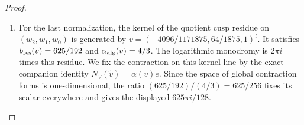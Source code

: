\documentclass[11pt,a4paper]{article}
\numberwithin{equation}{section}
\theoremstyle{definition}
\begin{document}
\begin{proof}
\begin{enumerate}[label=\arabic*.]
The extension is nontrivial, since its dual has no common
invariant vector by \cref{night:P1.1}; consequently its coordinate $s$ is nonzero.
Set $t=3125d/60$.  Its full row is
$\beta=s b+t r_0\Gamma_W$.  The constant bundle maps
\[
 C=\begin{pmatrix}1&-t r_0\\0&sI_5\end{pmatrix},\qquad
 C^{-1}=\begin{pmatrix}1&(t/s)r_0\\0&s^{-1}I_5\end{pmatrix}
\]
are holomorphic in the stated root frames and fix the invariant
section $e$.  Direct multiplication gives
\[
 C^{-1}\Gamma_6 C+C^{-1}dC
   =\begin{pmatrix}0&\beta\\0&\Gamma_W\end{pmatrix}.
\]
This proves the required equivalence of the complete flat bundles
with their fixed invariant line.  Evaluation at the marked basepoint
gives a common intertwiner for both specified meridians.  Thus its
existence follows from the exact connection maps.  

\item For the last normalization, the kernel of the quotient cusp residue
on $(w_2,w_1,w_0)$ is generated by
$v=(-4096/1171875,64/1875,1)^t$.
It satisfies $b_{\rm res}(v)=625/192$ and
$\alpha_{\rm alg}(v)=4/3$.
The logarithmic monodromy is $2\pi i$ times this residue.
We fix the contraction on this kernel line by the exact companion identity $N_V(\widetilde v)=\alpha(v)e$.
Since the space of global contraction forms is one-dimensional, the
ratio $(625/192)/(4/3)=625/256$ fixes its scalar everywhere and gives
the displayed $625\pi i/128$.

\end{enumerate}
\end{proof}
\end{document}
